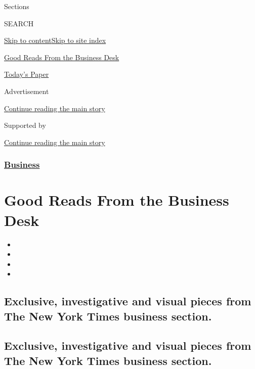Sections

SEARCH

\protect\hyperlink{site-content}{Skip to
content}\protect\hyperlink{site-index}{Skip to site index}

\href{https://www.nytimes3xbfgragh.onion/spotlight/editors-picks-business}{Good
Reads From the Business Desk}

\href{https://myaccount.nytimes3xbfgragh.onion/auth/login?response_type=cookie\&client_id=vi}{}

\href{https://www.nytimes3xbfgragh.onion/section/todayspaper}{Today's
Paper}

Advertisement

\protect\hyperlink{after-top}{Continue reading the main story}

Supported by

\protect\hyperlink{after-sponsor}{Continue reading the main story}

\hypertarget{business}{%
\subsubsection{\texorpdfstring{\href{/section/business}{Business}}{Business}}\label{business}}

\hypertarget{good-reads-from-the-business-desk}{%
\section{Good Reads From the Business
Desk}\label{good-reads-from-the-business-desk}}

\begin{itemize}
\item
\item
\item
\item
\end{itemize}

\hypertarget{exclusive-investigative-and-visual-pieces-from-the-new-york-times-business-section}{%
\subsection{Exclusive, investigative and visual pieces from The New York
Times business
section.}\label{exclusive-investigative-and-visual-pieces-from-the-new-york-times-business-section}}

\hypertarget{exclusive-investigative-and-visual-pieces-from-the-new-york-times-business-section-1}{%
\subsection{Exclusive, investigative and visual pieces from The New York
Times business
section.}\label{exclusive-investigative-and-visual-pieces-from-the-new-york-times-business-section-1}}

